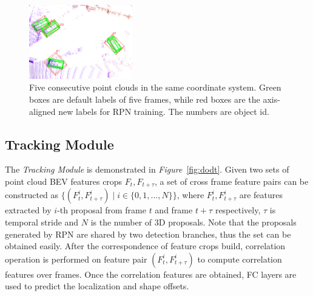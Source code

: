 \documentclass[letterpaper, 10 pt, conference]{ieeeconf}  %
\def\figurename{\emph{Figure}}
\begin{document}
\begin{figure}
	\vspace{-0.6cm}
	\rule{0pt}{1ex}
	\begin{center}
		\includegraphics[width=0.4\textwidth]{images/integrated_boxes.png}
	\end{center}
	\caption{Five consecutive point clouds in the same coordinate system. Green boxes are default labels of five frames, while red boxes are the axis-aligned new labels for RPN training. The numbers are object id.}
	\label{fig:integrated_boxes}
	\vspace{-0.5cm}
\end{figure}

\subsection{Tracking Module}
The \textit{Tracking Module} is demonstrated in \figurename \, \ref{fig:dodt}. Given two sets of point cloud BEV features crops $F_t, F_{t+\tau}$, a set of cross frame feature pairs can be constructed as $\{(F_t^i, F_{t+\tau}^i)\mid i \in \{0,1,...,N\}\}$, where $F_t^i, F_{t+\tau}^i$ are features extracted by $i$-th proposal from frame $t$ and frame $t+\tau$ respectively, $\tau$ is temporal stride and $N$ is the number of 3D proposals. Note that the proposals generated by RPN are shared by two detection branches, thus the set can be obtained easily. After the correspondence of feature crops build, correlation operation is performed on feature pair $(F_t^i, F_{t+\tau}^i)$ to compute correlation features over frames. Once the correlation features are obtained, FC layers are used to predict the localization and shape offsets.
\end{document}
